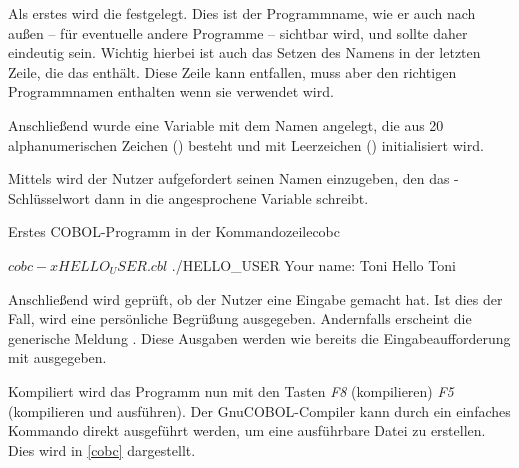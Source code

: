 Als erstes wird die  festgelegt. Dies ist der Programmname, wie er auch nach außen -- für eventuelle andere Programme -- sichtbar wird, und sollte daher eindeutig sein. Wichtig hierbei ist auch das Setzen des Namens in der letzten Zeile, die das  enthält. Diese Zeile kann entfallen, muss aber den richtigen Programmnamen enthalten wenn sie verwendet wird.

Anschließend wurde eine Variable mit dem Namen  angelegt, die aus 20 alphanumerischen Zeichen () besteht und mit Leerzeichen () initialisiert wird.

Mittels  wird der Nutzer aufgefordert seinen Namen einzugeben, den das -Schlüsselwort dann in die angesprochene Variable schreibt.

\begin{codeWithCaption}{Erstes COBOL-Programm in der Kommandozeile}{cobc}
    \begin{shellwindow}
    $ cobc -x HELLO_USER.cbl
    $ ./HELLO_USER
    Your name: Toni
    Hello Toni
    \end{shellwindow}
\end{codeWithCaption}

Anschließend wird geprüft, ob der Nutzer eine Eingabe gemacht hat. Ist dies der Fall, wird eine persönliche Begrüßung ausgegeben. Andernfalls erscheint die generische Meldung . Diese Ausgaben werden wie bereits die Eingabeaufforderung mit  ausgegeben.

Kompiliert wird das Programm nun mit den Tasten \textit{F8} (kompilieren) \bzw \textit{F5} (kompilieren und ausführen). Der GnuCOBOL-Compiler kann durch ein einfaches Kommando direkt ausgeführt werden, um eine ausführbare Datei zu erstellen. Dies wird in \autoref{cobc} dargestellt.